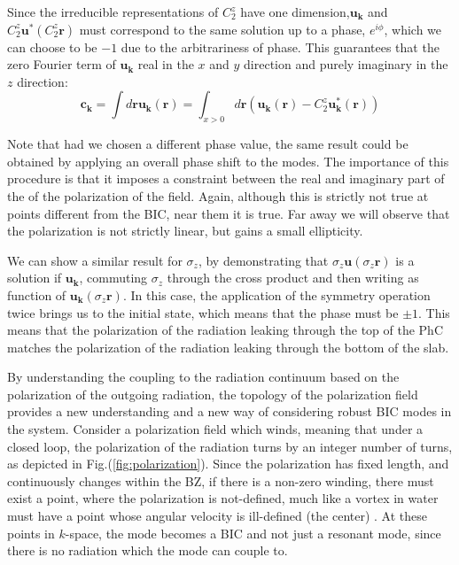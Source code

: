 Since the irreducible representations of $C_2^z$ have one dimension,$ \bm{u}_{\bm{k}}$ and $C_2^z \bm{u}^*(C_2^z \bm{r})$  must correspond to the same solution up to a phase, $e^{i\phi}$, which we can choose to be $-1$ due to the arbitrariness of phase. This guarantees that the zero Fourier term of $\bm{u}_{\bm{k}}$ real in the $x$ and $y$ direction and purely imaginary in the $z$ direction:
\begin{equation}
  \bm{c}_{\bm{k}} = \int d\bm{r} \bm{u}_{\bm{k}}(\bm{r}) = \int_{x>0} d\bm{r} (\bm{u}_{\bm{k}}(\bm{r}) - C_2^z \bm{u}_{\bm{k}}^*(\bm{r}))
\end{equation}

Note that had we chosen a different phase value, the same result could be obtained by applying an overall phase shift to the modes. The importance of this procedure is that it imposes a constraint between the real and imaginary part of the of the polarization of the field. Again, although this is strictly not true at points different from the BIC, near them it is true. Far away we will observe that the polarization is not strictly linear, but gains a small ellipticity.

We can show a similar result for $\sigma_z$, by demonstrating that $\sigma_z \bm{u}(\sigma_z \bm{r})$ is a solution if $\bm{u}_{\bm{k}}$, commuting $\sigma_z$ through the cross product and then writing as function of $\bm{u}_{\bm{k}}(\sigma_z \bm{r})$. In this case, the application of the symmetry operation twice brings us to the initial state, which means that the phase must be $\pm 1$. This means that the polarization of the radiation leaking through the top of the PhC matches the polarization of the radiation leaking through the bottom of the slab.

By understanding the coupling to the radiation continuum based on the polarization of the outgoing radiation, the topology of the polarization field provides a new understanding and a new way of considering robust BIC modes in the system. Consider a polarization field which winds, meaning that under a closed loop, the polarization of the radiation turns by an integer number of turns, as depicted in Fig.(\ref{fig:polarization}). Since the polarization has fixed length, and continuously changes within the BZ, if there is a non-zero winding, there must exist a point, where the polarization is not-defined, much like a vortex in water must have a point whose angular velocity is ill-defined (the center) . At these points in $k$-space, the mode becomes a BIC and not just a resonant mode, since there is no radiation which the mode can couple to.

